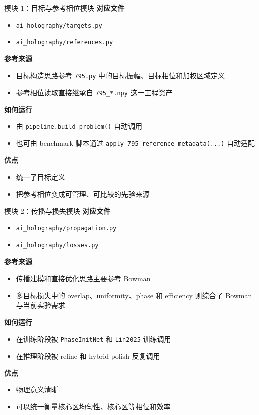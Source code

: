 \documentclass[aspectratio=169,10pt]{ctexbeamer}
\begin{document}
\begin{frame}{模块 1：目标与参考相位模块}
  \textbf{对应文件}
  \begin{itemize}
    \item \texttt{ai\_holography/targets.py}
    \item \texttt{ai\_holography/references.py}
  \end{itemize}

  \textbf{参考来源}
  \begin{itemize}
    \item 目标构造思路参考 \texttt{795.py} 中的目标振幅、目标相位和加权区域定义
    \item 参考相位读取直接继承自 \texttt{795\_*.npy} 这一工程资产
  \end{itemize}

  \textbf{如何运行}
  \begin{itemize}
    \item 由 \texttt{pipeline.build\_problem()} 自动调用
    \item 也可由 benchmark 脚本通过 \texttt{apply\_795\_reference\_metadata(...)} 自动适配
  \end{itemize}

  \textbf{优点}
  \begin{itemize}
    \item 统一了目标定义
    \item 把参考相位变成可管理、可比较的先验来源
  \end{itemize}
\end{frame}

\begin{frame}{模块 2：传播与损失模块}
  \textbf{对应文件}
  \begin{itemize}
    \item \texttt{ai\_holography/propagation.py}
    \item \texttt{ai\_holography/losses.py}
  \end{itemize}

  \textbf{参考来源}
  \begin{itemize}
    \item 传播建模和直接优化思路主要参考 Bowman
    \item 多目标损失中的 overlap、uniformity、phase 和 efficiency 则综合了 Bowman 与当前实验需求
  \end{itemize}

  \textbf{如何运行}
  \begin{itemize}
    \item 在训练阶段被 \texttt{PhaseInitNet} 和 \texttt{Lin2025} 训练调用
    \item 在推理阶段被 refine 和 hybrid polish 反复调用
  \end{itemize}

  \textbf{优点}
  \begin{itemize}
    \item 物理意义清晰
    \item 可以统一衡量核心区均匀性、核心区等相位和效率
  \end{itemize}
\end{frame}
\end{document}
